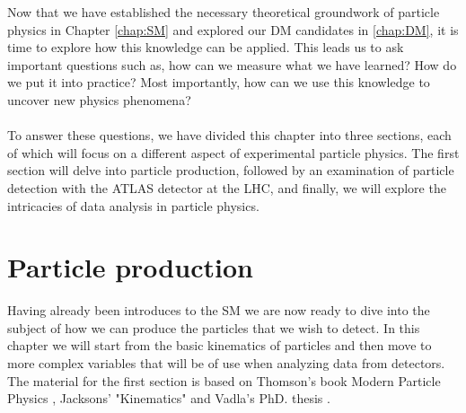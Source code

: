 \documentclass[12pt, a4paper]{book}
\begin{document}
\graphicspath{{../../figures/}}

Now that we have established the necessary theoretical groundwork of particle physics in Chapter \ref{chap:SM} and explored our DM candidates in \ref{chap:DM}, it is time to explore how this knowledge can be applied. This leads us to ask important questions such as, 
how can we measure what we have learned? How do we put it into practice? Most importantly, how can we use this knowledge to uncover new physics phenomena?\\
\\To answer these questions, we have divided this chapter into three sections, each of which will focus on a different aspect of experimental particle physics. The first section will delve into particle production, 
followed by an examination of particle detection with the ATLAS detector at the LHC, and finally, we will explore the intricacies of data analysis in particle physics.

\clearpage
\section{Particle production}
Having already been introduces to the SM we are now ready to dive into the subject of how we can produce the particles that we wish to detect. In this chapter we will start from the basic kinematics of particles 
and then move to more complex variables that will be of use when analyzing data from detectors. The material for the first section is based on Thomson's book Modern Particle Physics \cite{THOMSON}, Jacksons' "Kinematics" \cite{Jackson_kin}
and Vadla's PhD. thesis \cite{KNUT_VADLA}.
\end{document}
